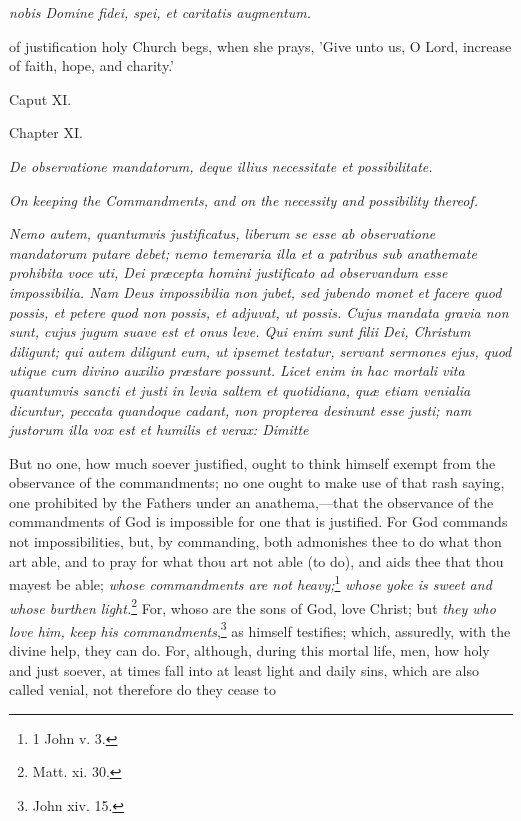 \emph{nobis Domine fidei, spei, et caritatis augmentum.}

of justification holy Church begs, when she prays, 'Give unto us, O Lord, increase of faith, hope, and charity.'

Caput XI.

Chapter XI.

\emph{De observatione mandatorum, deque illius necessitate et possibilitate.}

\emph{On keeping the Commandments, and on the necessity and possibility thereof.}

\emph{Nemo autem, quantumvis justificatus, liberum se esse ab observatione mandatorum putare debet; nemo temeraria illa et a patribus sub anathemate prohibita voce uti, Dei præcepta homini justificato ad observandum esse impossibilia. Nam Deus impossibilia non jubet, sed jubendo monet et facere quod possis, et petere quod non possis, et adjuvat, ut possis. Cujus mandata gravia non sunt, cujus jugum suave est et onus leve. Qui enim sunt filii Dei, Christum diligunt; qui autem diligunt eum, ut ipsemet testatur, servant sermones ejus, quod utique cum divino auxilio præstare possunt. Licet enim in hac mortali vita quantumvis sancti et justi in levia saltem et quotidiana, quæ etiam venialia dicuntur, peccata quandoque cadant, non propterea desinunt esse justi; nam justorum illa vox est et humilis et verax: Dimitte }

But no one, how much soever justified, ought to think himself exempt from the observance of the commandments; no one ought to make use of that rash saying, one prohibited by the Fathers under an anathema,—that the observance of the commandments of God is impossible for one that is justified. For God commands not impossibilities, but, by commanding, both admonishes thee to do what thon art able, and to pray for what thou art not able (to do), and aids thee that thou mayest be able; \emph{whose commandments are not heavy;}\footnote{\par   1 John v. 3.} \emph{whose yoke is sweet and whose burthen light.}\footnote{\par   Matt. xi. 30.} For, whoso are the sons of God, love Christ; but \emph{they who love him, keep his commandments},\footnote{\par   John xiv. 15.} as himself testifies; which, assuredly, with the divine help, they can do. For, although, during this mortal life, men, how holy and just soever, at times fall into at least light and daily sins, which are also called venial, not therefore do they cease to

